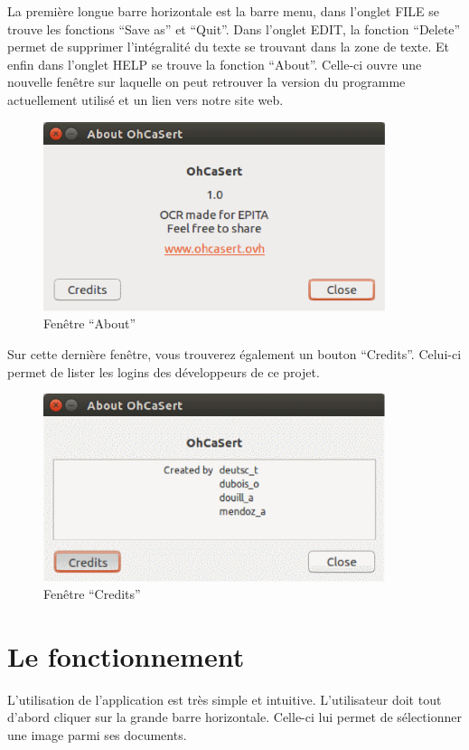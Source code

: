 \documentclass[11pt]{report}
\begin{document}
La première longue barre horizontale est la barre menu, dans l’onglet FILE se trouve les fonctions ``Save as'' et ``Quit''. Dans l’onglet EDIT, la fonction ``Delete'' permet de supprimer l’intégralité du texte se trouvant dans la zone de texte. Et enfin dans l’onglet HELP se trouve la fonction ``About''. Celle-ci ouvre une nouvelle fenêtre sur laquelle on peut retrouver la version du programme actuellement utilisé et un lien vers notre site web.

\begin{figure}[htbp]
\centering
\includegraphics[width=10cm]{gui-about.png}
\caption{Fenêtre ``About''}
\end{figure}

Sur cette dernière fenêtre, vous trouverez également un bouton ``Credits''. Celui-ci permet de lister les logins des développeurs de ce projet.

\begin{figure}[htbp]
\centering
\includegraphics[width=10cm]{gui-credits.png}
\caption{Fenêtre ``Credits''}
\end{figure}

\section{Le fonctionnement}

L'utilisation de l'application est très simple et intuitive. L'utilisateur doit tout d'abord cliquer sur la grande barre horizontale. Celle-ci lui permet de sélectionner une image parmi ses documents.
\end{document}

